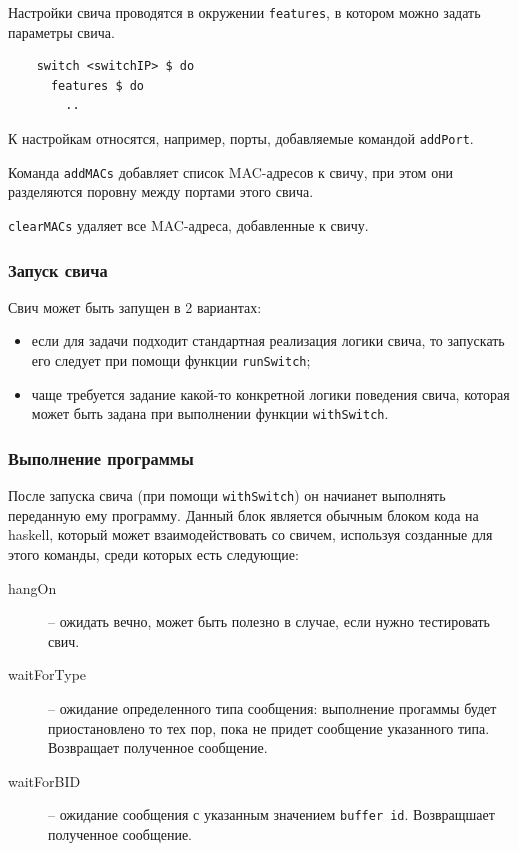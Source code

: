 \documentclass[9pt,a4paper]{article}
\begin{document}
Настройки свича проводятся в окружении \lstinline!features!, в котором можно
задать параметры свича.

\begin{lstlisting}
    switch <switchIP> $ do
      features $ do
        ..
\end{lstlisting}

К настройкам относятся, например, порты, добавляемые командой
\lstinline!addPort!.

Команда \lstinline!addMACs! добавляет список MAC-адресов к свичу, при этом они
разделяются поровну между портами этого свича.

\lstinline!clearMACs! удаляет все MAC-адреса, добавленные к свичу.


\subsubsection{Запуск свича}

Свич может быть запущен в 2 вариантах:

\begin{itemize}
  \item если для задачи подходит стандартная реализация логики свича, то
    запускать его следует при помощи функции \lstinline!runSwitch!;
  \item чаще требуется задание какой-то конкретной логики поведения свича,
    которая может быть задана при выполнении функции \lstinline!withSwitch!.
\end{itemize}


\subsubsection{Выполнение программы}
После запуска свича (при помощи \lstinline!withSwitch!) он начианет выполнять
переданную ему программу. Данный блок является обычным блоком кода на haskell,
который может взаимодействовать со свичем, используя созданные для этого
команды, среди которых есть следующие:

\begin{description}
  \item[hangOn] -- ожидать вечно, может быть полезно в случае, если нужно
    тестировать свич.

  \item[waitForType] -- ожидание определенного типа сообщения: выполнение
    прогаммы будет приостановлено то тех пор, пока не придет сообщение
    указанного типа. Возвращает полученное сообщение.

  \item[waitForBID] -- ожидание сообщения с указанным значением
    \lstinline!buffer id!.  Возвращшает полученное сообщение.

\end{description}
\end{document}
